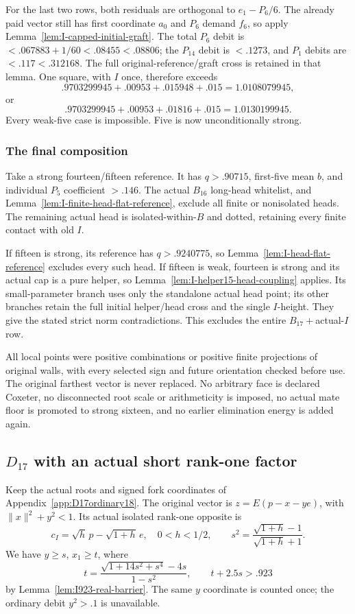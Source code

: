 \documentclass[11pt]{article}
\theoremstyle{definition}
\theoremstyle{remark}
\newcommand{\norm}[1]{\lVert #1\rVert}
\begin{document}
For the last two rows, both residuals are orthogonal to
\(e_1-P_6/6\). The already paid vector still has first coordinate
\(a_0\) and \(P_6\) demand \(f_6\), so apply
Lemma~\ref{lem:I-capped-initial-graft}.
The total \(P_6\) debit is
\(<.067883+1/60<.08455<.08806\); the \(P_{14}\) debit
is \(<.1273\), and \(P_1\) debits are \(<.117<.312168\).
The full original-reference/graft cross is retained in that lemma.
One square, with \(I\) once, therefore exceeds
\[
 .9703299945+.00953+.015948+.015=1.0108079945,
\]
or
\[
 .9703299945+.00953+.01816+.015=1.0130199945.
\]
Every weak-five case is impossible. Five is now unconditionally strong.

\subsubsection{The final composition}
Take a strong fourteen/fifteen reference. It has \(q>.90715\),
first-five mean \(b\), and individual \(P_5\) coefficient \(>.146\).
The actual \(B_{16}\) long-head whitelist, and
Lemma~\ref{lem:I-finite-head-flat-reference}, exclude all finite
or nonisolated heads. The remaining actual head is isolated-within-\(B\)
and dotted, retaining every finite contact with old \(I\).

If fifteen is strong, its reference has \(q>.9240775\), so
Lemma~\ref{lem:I-head-flat-reference} excludes every such head.
If fifteen is weak, fourteen is strong and its actual cap is a pure
helper, so Lemma~\ref{lem:I-helper15-head-coupling} applies.
Its small-parameter branch uses only the standalone actual head point;
its other branches retain the full initial helper/head cross and
the single \(I\)-height. They give the stated strict norm contradictions.
This excludes the entire \(B_{17}+\)actual-\(I\) row.

All local points were positive combinations or positive finite
projections of original walls, with every selected sign and future
orientation checked before use. The original farthest vector is never
replaced. No arbitrary face is declared Coxeter, no disconnected root
scale or arithmeticity is imposed, no actual mate floor is promoted to
strong sixteen, and no earlier elimination energy is added again.

\subsection[D17 with an actual short rank-one factor]{\(D_{17}\) with an actual short rank-one factor}
\label{app:D17I18}
Keep the actual roots and signed fork coordinates of
Appendix~\ref{app:D17ordinary18}. The original vector is
\(z=E(p-x-ye)\), with \(\norm x^2+y^2<1\). Its actual isolated
rank-one opposite is
\[
 c_I=\sqrt h\,p-\sqrt{1+h}\,e,\quad0<h<1/2,\qquad
 s^2={\frac{\sqrt{1+h}-1}{\sqrt{1+h}+1}}.
\]
We have \(y\ge s\), \(x_1\ge t\), where
\[
 t={\frac{\sqrt{1+14s^2+s^4}-4s}{1-s^2}},\qquad t+2.5s>.923
\]
by Lemma~\ref{lem:I923-real-barrier}. The same \(y\) coordinate
is counted once; the ordinary debit \(y^2>.1\) is unavailable.
\end{document}
